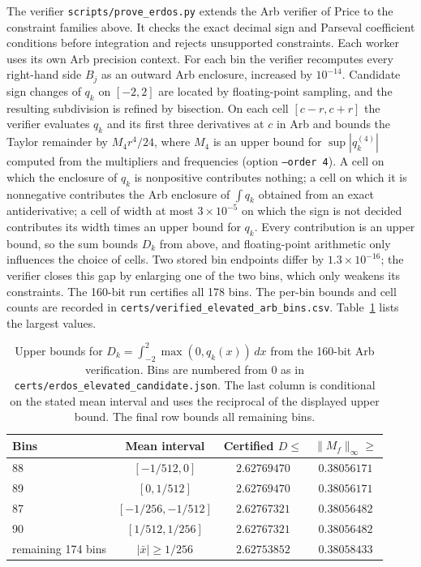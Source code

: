 \documentclass[11pt,a4paper]{article}
\theoremstyle{definition}
\theoremstyle{remark}
\begin{document}
The verifier \nolinkurl{scripts/prove_erdos.py} extends the Arb verifier of Price \cite{price2026} to the constraint families above. It checks the exact decimal sign and Parseval coefficient conditions before integration and rejects unsupported constraints. Each worker uses its own Arb precision context. For each bin the verifier recomputes every right-hand side $B_j$ as an outward Arb enclosure, increased by $10^{-14}$. Candidate sign changes of $q_k$ on $[-2, 2]$ are located by floating-point sampling, and the resulting subdivision is refined by bisection. On each cell $[c - r, c + r]$ the verifier evaluates $q_k$ and its first three derivatives at $c$ in Arb and bounds the Taylor remainder by $M_4 r^4/24$, where $M_4$ is an upper bound for $\sup |q_k^{(4)}|$ computed from the multipliers and frequencies (option \texttt{--order 4}). A cell on which the enclosure of $q_k$ is nonpositive contributes nothing; a cell on which it is nonnegative contributes the Arb enclosure of $\int q_k$ obtained from an exact antiderivative; a cell of width at most $3 \times 10^{-5}$ on which the sign is not decided contributes its width times an upper bound for $q_k$. Every contribution is an upper bound, so the sum bounds $D_k$ from above, and floating-point arithmetic only influences the choice of cells. Two stored bin endpoints differ by $1.3 \times 10^{-16}$; the verifier closes this gap by enlarging one of the two bins, which only weakens its constraints. The 160-bit run certifies all 178 bins. The per-bin bounds and cell counts are recorded in \nolinkurl{certs/verified_elevated_arb_bins.csv}. Table~\ref{tab:certified_bins} lists the largest values.

\begin{table}[h]
\centering
\small
\begin{tabular}{lccc}
\toprule
\textbf{Bins} & \textbf{Mean interval} & \textbf{Certified $D \le$} & \textbf{$\|M_f\|_\infty \ge$} \\
\midrule
88 & $[-1/512, 0]$ & $2.62769470$ & $0.38056171$ \\
89 & $[0, 1/512]$ & $2.62769470$ & $0.38056171$ \\
87 & $[-1/256, -1/512]$ & $2.62767321$ & $0.38056482$ \\
90 & $[1/512, 1/256]$ & $2.62767321$ & $0.38056482$ \\
remaining 174 bins & $|\bar{x}| \ge 1/256$ & $2.62753852$ & $0.38058433$ \\
\bottomrule
\end{tabular}
\caption{Upper bounds for $D_k = \int_{-2}^2 \max(0,q_k(x))\,dx$ from the 160-bit Arb verification. Bins are numbered from $0$ as in \nolinkurl{certs/erdos_elevated_candidate.json}. The last column is conditional on the stated mean interval and uses the reciprocal of the displayed upper bound. The final row bounds all remaining bins.}
\label{tab:certified_bins}
\end{table}
\end{document}

